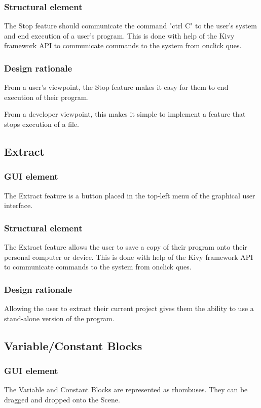 \documentclass[journal,10pt,onecolumn,compsoc]{IEEEtran} \usepackage[margin=1.0in]{geometry} \usepackage{pdfpages}
\begin{document}
\subsubsection{Structural element}
\noindent The Stop feature should communicate the command "ctrl C" to the user's system and end execution of a user's program.
This is done with help of the Kivy framework API to communicate commands to the system from onclick ques. \cite{Kivy}
\subsubsection{Design rationale}
\noindent From a user's viewpoint, the Stop feature makes it easy for them to end execution of their program.

\noindent From a developer viewpoint, this makes it simple to implement a feature that stops execution of a file.
\subsection{Extract}
\subsubsection{GUI element}
\noindent The Extract feature is a button placed in the top-left menu of the graphical user interface.
\subsubsection{Structural element}
\noindent The Extract feature allows the user to save a copy of their program onto their personal computer or device.  
This is done with help of the Kivy framework API to communicate commands to the system from onclick ques.\cite{Kivy}
\subsubsection{Design rationale}
\noindent Allowing the user to extract their current project gives them the ability to use a stand-alone version of the program.
\subsection{Variable/Constant Blocks}
\subsubsection{GUI element}
\noindent The Variable and Constant Blocks are represented as rhombuses. 
They can be dragged and dropped onto the Scene.
\end{document}
